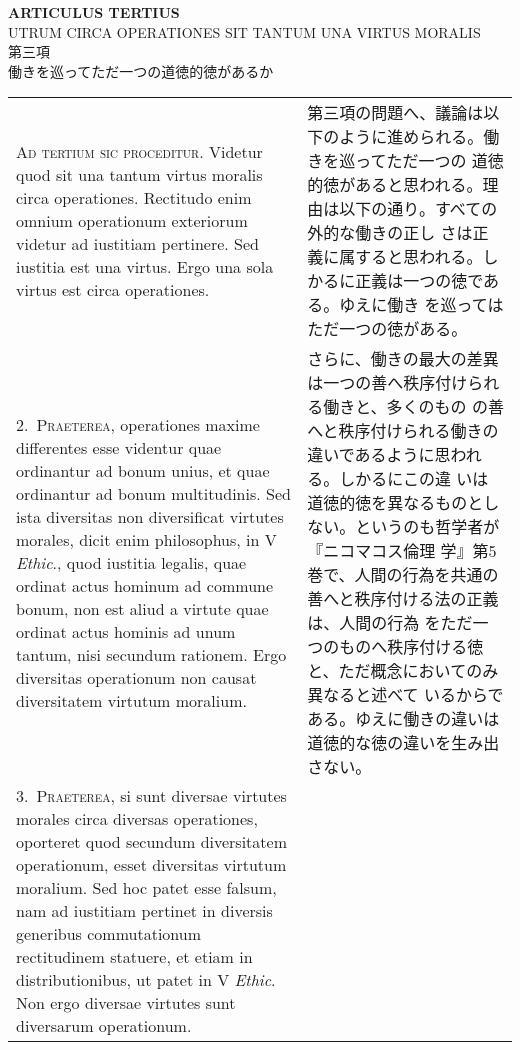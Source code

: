 \documentclass[10pt]{jsarticle}
\begin{document}
\begin{center}
{\Large {\bf ARTICULUS TERTIUS}}\\
{\large UTRUM CIRCA OPERATIONES SIT TANTUM UNA VIRTUS MORALIS}\\
{\Large 第三項\\働きを巡ってただ一つの道徳的徳があるか}
\end{center}

\begin{longtable}{p{21em}p{21em}}
{\scshape Ad tertium sic proceditur}. Videtur quod sit una tantum
virtus moralis circa operationes. Rectitudo enim omnium operationum
exteriorum videtur ad iustitiam pertinere. Sed iustitia est una
virtus. Ergo una sola virtus est circa operationes.

&

 第三項の問題へ、議論は以下のように進められる。働きを巡ってただ一つの
 道徳的徳があると思われる。理由は以下の通り。すべての外的な働きの正し
 さは正義に属すると思われる。しかるに正義は一つの徳である。ゆえに働き
 を巡ってはただ一つの徳がある。
 
\\

2.~{\scshape Praeterea}, operationes maxime differentes esse videntur
quae ordinantur ad bonum unius, et quae ordinantur ad bonum
multitudinis. Sed ista diversitas non diversificat virtutes morales,
dicit enim philosophus, in V {\itshape Ethic}., quod iustitia legalis,
quae ordinat actus hominum ad commune bonum, non est aliud a virtute
quae ordinat actus hominis ad unum tantum, nisi secundum
rationem. Ergo diversitas operationum non causat diversitatem virtutum
moralium.


&

 さらに、働きの最大の差異は一つの善へ秩序付けられる働きと、多くのもの
 の善へと秩序付けられる働きの違いであるように思われる。しかるにこの違
 いは道徳的徳を異なるものとしない。というのも哲学者が『ニコマコス倫理
 学』第5巻で、人間の行為を共通の善へと秩序付ける法の正義は、人間の行為
 をただ一つのものへ秩序付ける徳と、ただ概念においてのみ異なると述べて
 いるからである。ゆえに働きの違いは道徳的な徳の違いを生み出さない。

 
\\



3.~{\scshape Praeterea}, si sunt diversae virtutes morales circa
diversas operationes, oporteret quod secundum diversitatem
operationum, esset diversitas virtutum moralium. Sed hoc patet esse
falsum, nam ad iustitiam pertinet in diversis generibus commutationum
rectitudinem statuere, et etiam in distributionibus, ut patet in V
{\itshape Ethic}. Non ergo diversae virtutes sunt diversarum
operationum.



\end{longtable}
\end{document}
